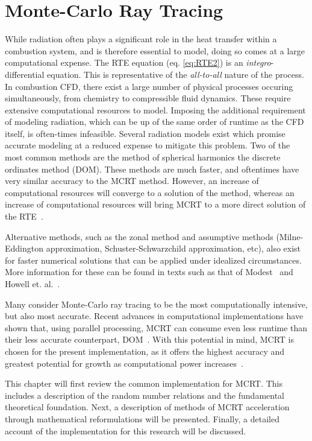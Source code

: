 \addchapheadtotoc
\chapter{Monte-Carlo Ray Tracing}\label{chapter:Modeling}
While radiation often plays a significant role in the heat transfer within a combustion system, and is therefore essential to model, doing so comes at a large computational expense. 
The RTE equation (eq. \ref{eq:RTE2}) is an \textit{integro}-differential equation. This is representative of the \textit{all-to-all} nature of the process. In combustion CFD, there exist a large number of physical processes occuring simultaneously, from chemistry to compressible fluid dynamics. 
These require extensive computational resources to model. Imposing the additional requirement of modeling radiation, which can be up of the same order of runtime as the CFD itself, is often-times infeasible. 
Several radiation models exist which promise accurate modeling at a reduced expense to mitigate this problem. Two of the most common methods are the method of spherical harmonics the discrete ordinates method (DOM).
These methods are much faster, and oftentimes have very similar accuracy to the MCRT method. However, an increase of computational resources will converge to a solution of the method, whereas an increase of computational resources will bring MCRT to a more direct solution of the RTE~\cite{Leccese2018ConvectiveChambers}.

Alternative methods, such as the zonal method and assumptive methods (Milne-Eddington approximation, Schuster-Schwarzchild approximation, etc), also exist for faster numerical solutions that can be applied under idealized circumstances.
More information for these can be found in texts such as that of Modest~\cite{Modest2013RadiativeTransfer} and Howell et. al.~\cite{Howell2010ThermalTransfer}.

Many consider Monte-Carlo ray tracing to be the most computationally intensive, but also most accurate.
Recent advances in computational implementations have shown that, using parallel processing, MCRT can consume even less runtime than their less accurate counterpart, DOM~\cite{Humphrey2016RadiativeRefinement}.
With this potential in mind, MCRT is chosen for the present implementation, as it offers the highest accuracy and greatest potential for growth as computational power increases~\cite{Liu2020TheFlames,Howell2010ThermalTransfer}.

This chapter will first review the common implementation for MCRT. This includes a description of the random number relations and the fundamental theoretical foundation.
Next, a description of methods of MCRT acceleration through mathematical reformulations will be presented.
Finally, a detailed account of the implementation for this research will be discussed.

